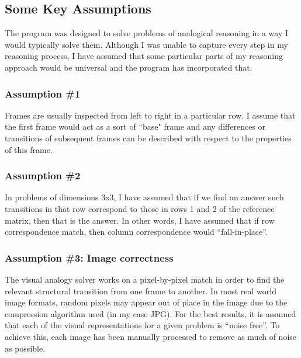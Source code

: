 \documentclass[10pt, letter]{article}
\begin{document}
\subsection*{Some Key Assumptions}
The program was designed to solve problems of analogical reasoning in a way I would typically solve them. Although I was unable to capture every step in my reasoning process,  I have assumed that some particular parts of my reasoning approach would be universal and the program has incorporated that. 
	\subsubsection*{Assumption \#1}
Frames are usually inspected from left to right in a particular row. I assume that the first frame would act as a sort of ``base" frame and any differences or transitions of subsequent frames can be described with respect to the properties of this frame.
	\subsubsection*{Assumption \#2}
In problems of dimensions 3x3, I have assumed that if we find an answer such transitions in that row correspond to those in rows 1 and 2 of the reference matrix, then that is the answer. In other words, I have assumed that if row correspondence match, then column correspondence would ``fall-in-place''.
	\subsubsection*{Assumption \#3: Image correctness}
The visual analogy solver works on a pixel-by-pixel match in order to find the relevant structural transition from one frame to another. In most real world image formats, random pixels may appear out of place in the image due to the compression algorithm used (in my case JPG). For the best results, it is assumed that each of the visual representations for a given problem is ``noise free''. To achieve this, each image has been manually processed to remove as much of noise as possible.
\end{document}
